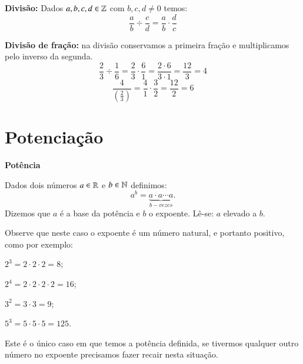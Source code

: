  \vskip0.3cm
 
 \colorbox{azul}{
 \begin{minipage}{14.5cm}
 \begin{center}
  \textbf{Divisão:} Dados $a, b, c, d \in \mathbb{Z}$ com $b, c, d \neq 0$ temos:
 \[\frac{a}{b} \div \frac{c}{d}= \frac{a}{b} \cdot \frac{d}{c} \]
 \end{center}
 \end{minipage}}
 
 \vskip0.3cm
 \begin{exem}
  \textbf{Divisão de fração:} na divisão conservamos a primeira fração e multiplicamos pelo inverso da segunda.
   \[\frac{2}{3} \div \frac{1}{6}= \frac{2}{3} \cdot \frac{6}{1}= \frac{2 \cdot 6}{3 \cdot 1}= \frac{12}{3}= 4 \]
   \[\frac{4}{\left(\frac{2}{3}\right)}= \frac{4}{1} \cdot \frac{3}{2}= \frac{12}{2}=6\]
 \end{exem}

 
 \vskip0.3cm

 
 \section{Potenciação}
 
  \vskip0.3cm

 \textbf{Potência}
 
 \vskip0.3cm
 
 \colorbox{azul}{
 \begin{minipage}{14.5cm}
 \begin{center}
  Dados dois números $a \in \mathbb{R}$ e $b \in \mathbb{N}$ definimos:
 \[a^b= \underbrace{a \cdot a \cdots a}_{b - vezes} .\]
  Dizemos que $a$ é a base da potência e $b$ o expoente. Lê-se: $a$ elevado a $b$.
 \end{center}
 \end{minipage}}
 
 \vskip0.3cm
 
 \begin{exem}
 Observe que neste caso o expoente é um número natural, e portanto positivo, como por exemplo:
 
  $2^3= 2 \cdot 2 \cdot 2= 8$;
  
  $2^4=2 \cdot 2 \cdot 2 \cdot  2= 16$;
  
  $3^2= 3 \cdot 3= 9$;
  
  $5^3= 5 \cdot 5 \cdot 5= 125$.
  
  Este é o único caso em que temos a potência definida, se tivermos qualquer outro número no expoente precisamos fazer recair nesta situação.
 \end{exem}

